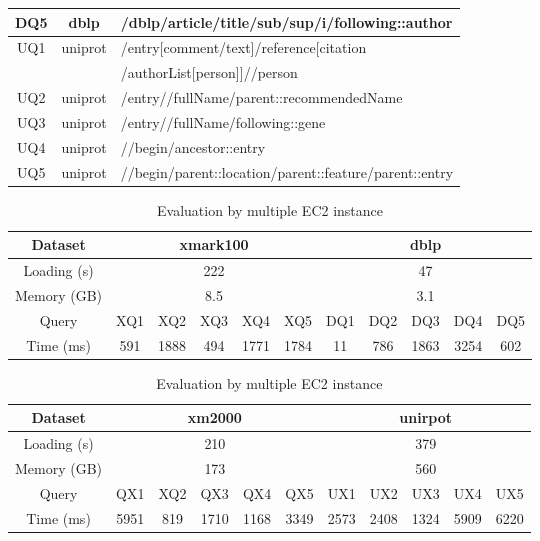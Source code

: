 \begin{table}
\begin{tabular}{c|c|l}
		\hline
		DQ5 & dblp & /dblp/article/title/sub/sup/i/following::author \\
		\hline
		UQ1 & uniprot & /entry[comment/text]/reference[citation \\
		&&/authorList[person]]//person\\
		\hline
		UQ2 & uniprot & /entry//fullName/parent::recommendedName \\
		\hline
		UQ3 & uniprot & /entry//fullName/following::gene \\
		\hline
		UQ4 & uniprot & //begin/ancestor::entry\\
		\hline
		UQ5 & uniprot & //begin/parent::location/parent::feature/parent::entry \\
		\hline
	\end{tabular}
\end{table}


\begin{table}[t]
	\centering
	\caption{Evaluation by one EC2 instance}
	\label{tab:singeval}
	\begin{tabular}{c|c|c|c|c|c|c|c|c|c|c}
		\hline \hline
		Dataset     & \multicolumn{5}{c|}{xmark100} & \multicolumn{5}{c}{dblp} \\ \hline
		Loading (s)    & \multicolumn{5}{c|}{222}          & \multicolumn{5}{c}{47}       \\ \hline
		Memory (GB) & \multicolumn{5}{c|}{8.5}          & \multicolumn{5}{c}{3.1}       \\ \hline
		Query       & XQ1  & XQ2   & XQ3 & XQ4  & XQ5  & DQ1 & DQ2 & DQ3  & DQ4  & DQ5 \\ \hline
		Time (ms)    & 591  & 1888  & 494 & 1771 & 1784 & 11  & 786 & 1863 & 3254 & 602 \\ \hline
	\end{tabular}
	\vspace{10px}
	\caption{Evaluation by multiple EC2 instance}
	\centering
	\label{tab:multieval}
	\begin{tabular}{c|c|c|c|c|c|c|c|c|c|c}
		\hline \hline
		Dataset	&	\multicolumn{5}{|c|}{xm2000}     & \multicolumn{5}{c}{unirpot}       \\
		\hline
		Loading (s)	&	\multicolumn{5}{|c|}{210}     & \multicolumn{5}{c}{379}       \\
		\hline
		Memory (GB)	&	\multicolumn{5}{|c|}{173}     & \multicolumn{5}{c}{560}       \\
		\hline
		Query	& QX1      & XQ2     & QX3      & QX4      & QX5      & UX1      & UX2      & UX3      & UX4      & UX5      \\
		\hline
		Time (ms) & 5951 & 819 & 1710 & 1168 & 3349 & 2573 & 2408 & 1324 & 5909 & 6220\\
		\hline
	\end{tabular}
\end{table} 



